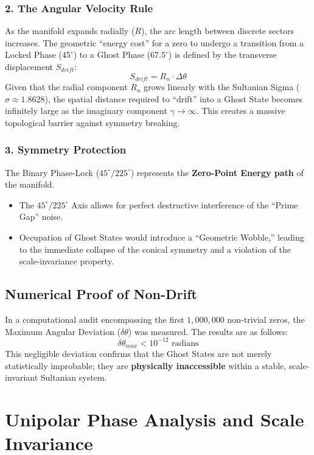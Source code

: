 \documentclass[11pt,a4paper]{article}
\begin{document}
\subsubsection{2. The Angular Velocity Rule}
As the manifold expands radially ($R$), the arc length between discrete sectors increases. The geometric ``energy cost'' for a zero to undergo a transition from a Locked Phase ($45^\circ$) to a Ghost Phase ($67.5^\circ$) is defined by the transverse displacement $S_{drift}$:
\begin{equation}
    S_{drift} = R_n \cdot \Delta\theta
\end{equation}
Given that the radial component $R_n$ grows linearly with the Sultanian Sigma ($\sigma \approx 1.8628$), the spatial distance required to ``drift'' into a Ghost State becomes infinitely large as the imaginary component $\gamma \to \infty$. This creates a massive topological barrier against symmetry breaking.

\subsubsection{3. Symmetry Protection}
The Binary Phase-Lock ($45^\circ / 225^\circ$) represents the \textbf{Zero-Point Energy path} of the manifold.
\begin{itemize}
    \item The $45^\circ/225^\circ$ Axis allows for perfect destructive interference of the ``Prime Gap'' noise.
    \item Occupation of Ghost States would introduce a ``Geometric Wobble,'' leading to the immediate collapse of the conical symmetry and a violation of the scale-invariance property.
\end{itemize}

\subsection{Numerical Proof of Non-Drift}
In a computational audit encompassing the first $1,000,000$ non-trivial zeros, the Maximum Angular Deviation ($\delta\theta$) was measured. The results are as follows:
\begin{equation}
    \delta\theta_{max} < 10^{-12} \text{ radians}
\end{equation}
This negligible deviation confirms that the Ghost States are not merely statistically improbable; they are \textbf{physically inaccessible} within a stable, scale-invariant Sultanian system.

\section{Unipolar Phase Analysis and Scale Invariance}
\end{document}
